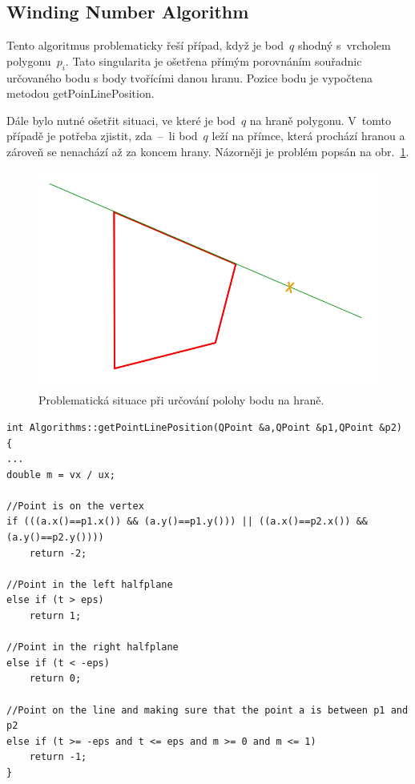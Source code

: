 \documentclass[a4paper, 12pt, oneside, titlepage]{article} %
\begin{document}
\subsection{Winding Number Algorithm} \label{WNA_problem}
Tento algoritmus problematicky řeší případ, když je bod~$q$ shodný s~vrcholem polygonu~$p_i$. Tato singularita je ošetřena přímým porovnáním souřadnic určovaného bodu s body tvořícími danou hranu. Pozice bodu je vypočtena metodou getPoinLinePosition. 

Dále bylo nutné ošetřit situaci, ve které je bod~$q$ na hraně polygonu. V~tomto případě je potřeba zjistit, zda~--~li bod~$q$ leží na přímce, která prochází hranou a zároveň se nenachází až za koncem hrany. Názorněji je problém popsán na obr.~\ref{fig:bodzahranou}.

\begin{figure}[htbh]
	\centering
	\includegraphics[scale=0.6]{obrazky/bodzahranou.png}
	\caption{Problematická situace při určování polohy bodu na hraně.
	}
	\label{fig:bodzahranou}
\end{figure} 
\FloatBarrier

\begin{verbatim}
int Algorithms::getPointLinePosition(QPoint &a,QPoint &p1,QPoint &p2)
{
...
double m = vx / ux;

//Point is on the vertex
if (((a.x()==p1.x()) && (a.y()==p1.y())) || ((a.x()==p2.x()) && (a.y()==p2.y())))
    return -2;

//Point in the left halfplane
else if (t > eps)
    return 1;

//Point in the right halfplane
else if (t < -eps)
    return 0;

//Point on the line and making sure that the point a is between p1 and p2
else if (t >= -eps and t <= eps and m >= 0 and m <= 1)
    return -1;
}
\end{verbatim}
\end{document}
